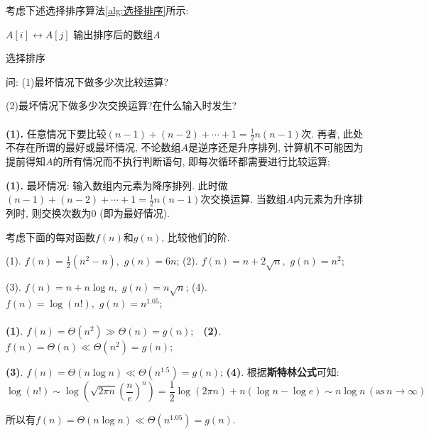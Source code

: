 \documentclass{article}
\begin{document}
\begin{homeworkProblem}
	考虑下述选择排序算法\ref{alg:选择排序}所示: 
	
	\begin{algorithm}[H]
		\begin{algorithmic}[1]
				\State $A[i] \leftrightarrow  A[j]$
				\EndIf
			\EndFor
		\EndFor
		\State 输出排序后的数组$A$
		\end{algorithmic}
		\caption{选择排序}
		\label{alg:选择排序}
	\end{algorithm}
	问: (1)最坏情况下做多少次比较运算?

	(2)最坏情况下做多少次交换运算?在什么输入时发生?
	\\

	\solution
	\\

	\textbf{(1).} 任意情况下要比较$\left( n-1 \right) +\left( n-2 \right) +\cdots +1=\frac{1}{2}n\left( n-1 \right) $次. 再者, 此处不存在所谓的最好或最坏情况, 不论数组$A$是逆序还是升序排列, 计算机不可能因为提前得知$A$的所有情况而不执行判断语句, 即每次循环都需要进行比较运算;

	\textbf{(1).} 最坏情况: 输入数组内元素为降序排列. 此时做$\left( n-1 \right) +\left( n-2 \right) +\cdots +1=\frac{1}{2}n\left( n-1 \right) $次交换运算. 当数组$A$内元素为升序排列时, 则交换次数为0 (即为最好情况).
\end{homeworkProblem}

\begin{homeworkProblem}
	考虑下面的每对函数$f(n)$和$g(n)$, 比较他们的阶.

	(1). $f\left( n \right) =\frac{1}{2}\left( n^2-n \right) ,\,\, g\left( n \right) =6n$; \quad \quad (2). $f\left( n \right) =n+2\sqrt{n},\,\, g\left( n \right) =n^2$;

	(3). $f\left( n \right) =n+n\log n,\,\, g\left( n \right) =n\sqrt{n}$; \quad (4). $f\left( n \right) =\log \left( n! \right) ,\,\, g\left( n \right) =n^{1.05}$;
	\\

	\solution
	\\

	\textbf{(1)}. $f\left( n \right) =\Theta \left( n^2 \right) \gg \Theta \left( n \right) =g\left( n \right)$; \quad \quad \quad \,\,\,\,\textbf{(2)}. $f\left( n \right) =\Theta \left( n \right) \ll \Theta \left( n^2 \right) =g\left( n \right) $;

	\textbf{(3)}. $f\left( n \right) =\Theta \left( n\log n \right) \ll \Theta \left( n^{1.5} \right) =g\left( n \right) $; \quad \textbf{(4)}. 根据\textbf{斯特林公式}可知:$$\log \left( n! \right) \sim \log \left( \sqrt{2\pi n}\left( \frac{n}{e} \right) ^n \right) =\frac{1}{2}\log \left( 2\pi n \right) +n\left( \log n-\log e \right) \sim n\log n \, \left( \mathrm{as} \,n\rightarrow \infty \right) 
	$$

	所以有$f\left( n \right) =\Theta \left( n\log n \right) \ll \Theta \left( n^{1.05} \right) =g\left( n \right) $.
\end{homeworkProblem}
\end{document}
